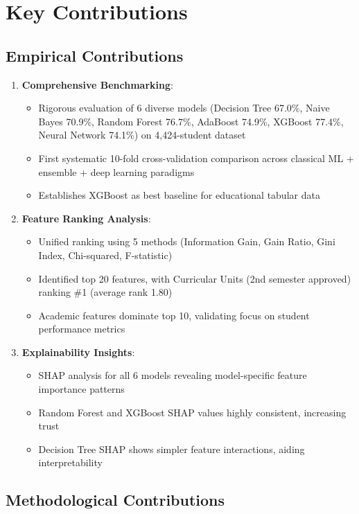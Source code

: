 \section{Key Contributions}

\subsection{Empirical Contributions}

\begin{enumerate}
\item \textbf{Comprehensive Benchmarking}:
\begin{itemize}
\item Rigorous evaluation of 6 diverse models (Decision Tree 67.0\%, Naive Bayes 70.9\%, Random Forest 76.7\%, AdaBoost 74.9\%, XGBoost 77.4\%, Neural Network 74.1\%) on 4,424-student dataset
\item First systematic 10-fold cross-validation comparison across classical ML + ensemble + deep learning paradigms
\item Establishes XGBoost as best baseline for educational tabular data
\end{itemize}

\item \textbf{Feature Ranking Analysis}:
\begin{itemize}
\item Unified ranking using 5 methods (Information Gain, Gain Ratio, Gini Index, Chi-squared, F-statistic)
\item Identified top 20 features, with Curricular Units (2nd semester approved) ranking \#1 (average rank 1.80)
\item Academic features dominate top 10, validating focus on student performance metrics
\end{itemize}

\item \textbf{Explainability Insights}:
\begin{itemize}
\item SHAP analysis for all 6 models revealing model-specific feature importance patterns
\item Random Forest and XGBoost SHAP values highly consistent, increasing trust
\item Decision Tree SHAP shows simpler feature interactions, aiding interpretability
\end{itemize}
\end{enumerate}

\subsection{Methodological Contributions}

